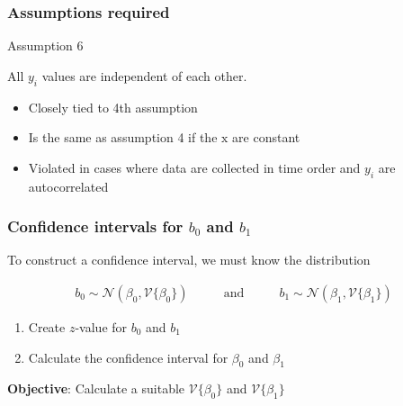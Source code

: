 \begin{frame}\frametitle{Assumptions required}
	\begin{block}
		{Assumption 6}
		\begin{center}
			All $y_i$ values are independent of each other.
		\end{center}
	\end{block}
	\begin{itemize}
		\item	Closely tied to 4th assumption
		\item	Is the same as assumption 4 if the $\mathrm{x}$ are constant
		\item	Violated in cases where data are collected in time order and $y_i$ are autocorrelated
	\end{itemize}
\end{frame}

\begin{frame}\frametitle{Confidence intervals for $b_0$ and $b_1$}

	To construct a confidence interval, we must know the distribution

	$$
	\begin{array}{lcr}
		b_0 \sim \mathcal{N}(\beta_0, \mathcal{V}\{\beta_0\}) &\qquad\text{and}\qquad& b_1 \sim \mathcal{N}(\beta_1,\mathcal{V}\{\beta_1\})
	\end{array}
	$$
	\begin{enumerate}
		\item	Create $z$-value for $b_0$ and $b_1$
		\item	Calculate the confidence interval for $\beta_0$ and $\beta_1$
	\end{enumerate}

	\textbf{Objective}: Calculate a suitable $\mathcal{V}\{\beta_0\}$ and $\mathcal{V}\{\beta_1\}$
\end{frame}

